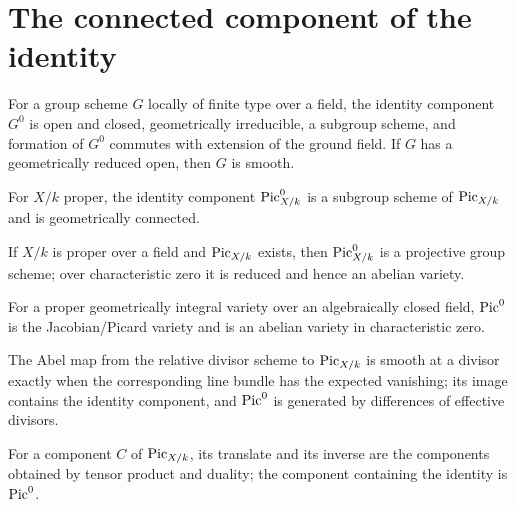 \section{The connected component of the identity}
\begin{lemma}\label{fga-lem-9-5-1}
For a group scheme $G$ locally of finite type over a field, the identity
component $G^0$ is open and closed, geometrically irreducible, a subgroup
scheme, and formation of $G^0$ commutes with extension of the ground field.
If $G$ has a geometrically reduced open, then $G$ is smooth.
\end{lemma}
\begin{proposition}\label{fga-prop-9-5-3}
For $X/k$ proper, the identity component $\operatorname{Pic}^0_{X/k}$ is a subgroup scheme
of $\operatorname{Pic}_{X/k}$ and is geometrically connected.
\end{proposition}
\begin{theorem}\label{fga-thm-9-5-4}
If $X/k$ is proper over a field and $\operatorname{Pic}_{X/k}$ exists, then $\operatorname{Pic}^0_{X/k}$
is a projective group scheme; over characteristic zero it is reduced and hence
an abelian variety.
\end{theorem}
\begin{corollary}\label{fga-cor-9-5-5}
For a proper geometrically integral variety over an algebraically closed field,
$\operatorname{Pic}^0$ is the Jacobian/Picard variety and is an abelian variety in
characteristic zero.
\end{corollary}
\begin{theorem}\label{fga-thm-9-5-11}
The Abel map from the relative divisor scheme to $\operatorname{Pic}_{X/k}$ is smooth at a
divisor exactly when the corresponding line bundle has the expected vanishing;
its image contains the identity component, and $\operatorname{Pic}^0$ is generated by
differences of effective divisors.
\end{theorem}
\begin{definition}\label{fga-def-9-5-9}
For a component $C$ of $\operatorname{Pic}_{X/k}$, its translate and its inverse are the
components obtained by tensor product and duality; the component containing the
identity is $\operatorname{Pic}^0$.
\end{definition}
